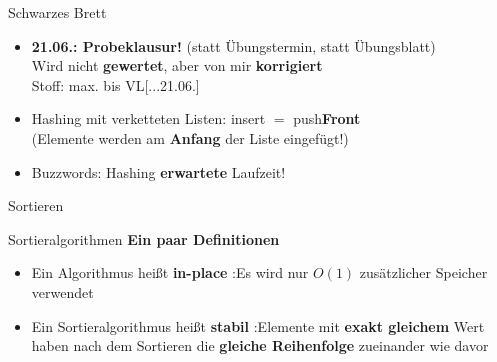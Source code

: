 




	
	

\begin{frame}{Schwarzes Brett}
	\begin{itemize}
		\item \textbf{21.06.: Probeklausur!} (statt Übungstermin, statt Übungsblatt) \\
		Wird nicht \textbf{gewertet}, aber von mir \textbf{korrigiert} \\
		Stoff: max. bis VL[...21.06.]
		\pause
		\item Hashing mit verketteten Listen: insert $=$ push\textbf{Front} \\
		(Elemente werden am \textbf{Anfang} der Liste eingefügt!)
		\pause
		\item Buzzwords: Hashing \gdw \textbf{erwartete} Laufzeit!
	\end{itemize}
\end{frame}

\begin{headframe} %
	Sortieren
\end{headframe}

\begin{frame}{Sortieralgorithmen}
	\textbf{Ein paar Definitionen} \\[0,125cm]
	\begin{itemize}
		\item Ein Algorithmus heißt \textbf{in-place} :\gdw Es wird nur $O(1)$ zusätzlicher Speicher verwendet
		\pause
		\item Ein Sortieralgorithmus heißt \textbf{stabil} :\gdw Elemente mit \textbf{exakt gleichem} Wert haben nach dem Sortieren die \textbf{gleiche Reihenfolge} zueinander wie davor
	\end{itemize}
\end{frame}
	

